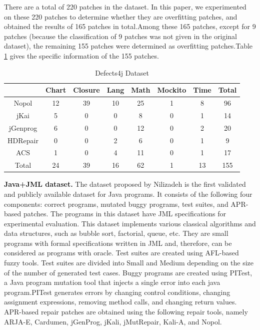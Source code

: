 There are a total of 220 patches in the dataset. In this paper, we experimented on these 220 patches to determine whether they are overfitting patches, and obtained the results of 165 patches in total.Among these 165 patches, except for 9 patches (because the classification of 9 patches was not given in the original dataset), the remaining 155 patches were determined as overfitting patches.Table \ref{tab1} gives the specific information of the 155 patches.
\begin{table}[ht]
	\begin{center}
		\begin{minipage}{\textwidth}
			\caption{Defects4j Dataset}\label{tab1}%
			
			\begin{tabular}{cccccccc}
				\toprule
				\diagbox{Project}{Tools} &Chart	&Closure	&Lang	&Math &Mockito &Time &Total \\ \hline
				Nopol  &12 &39	&10  &25 &1 &8 &96\\ 
				jKai  &5 &0	&0  &8 &0 &1 &14\\ 
				jGenprog  &6 &0	&0  &12 &0 &2 &20\\ 
				HDRepair  &0 &0	&2 &6  &0 &1 &9\\ 
				ACS  &1 &0	&4  &11 &0 &1 &17\\ 
				Total  &24 &39	&16  &62 &1 &13 &155 \\
				\bottomrule
			\end{tabular}
			
		\end{minipage}
	\end{center}
\end{table}

\textbf{Java+JML dataset.} The dataset proposed by Nilizadeh is the first validated and publicly available dataset for Java programs. It consists of the following four components: correct programs, mutated buggy programs, test suites, and APR-based patches. The programs in this dataset have JML specifications for experimental evaluation. This dataset implements various classical algorithms and data structures, such as bubble sort, factorial, queue, etc. They are small programs with formal specifications written in JML and, therefore, can be considered as programs with oracle. Test suites are created using AFL-based fuzzy tools. Test suites are divided into Small and Medium depending on the size of the number of generated test cases. Buggy programs are created using PITest, a Java program mutation tool that injects a single error into each java program.PITest generates errors by changing control conditions, changing assignment expressions, removing method calls, and changing return values. APR-based repair patches are obtained using the following repair tools, namely ARJA-E, Cardumen, jGenProg, jKali, jMutRepair, Kali-A, and Nopol.

